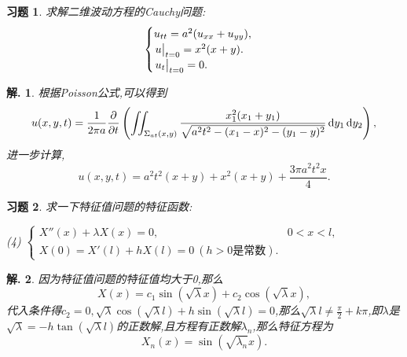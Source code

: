 \documentclass[a4paper,oneside,12pt]{ctexart}
\theoremstyle{plain}
\newtheorem{exercise}{习题}
\theoremstyle{nonumberplain}
\newtheorem{solution}{解.}
\theoremstyle{nonumberplain}
\begin{document}
    \begin{exercise}
        \label{ex:21}
        求解二维波动方程的Cauchy问题:
        \begin{equation*}
            \begin{cases}
                u_{tt}=a^2(u_{xx}+u_{yy}),\\
                \eval{u}_{t=0}=x^2(x+y).\\
                \eval{u_t}_{t=0}=0.
            \end{cases}
        \end{equation*}
    \end{exercise}
    
    \begin{solution}
        根据Poisson公式,可以得到 
        \begin{equation*}
            u(x,y,t)=\frac{1}{2\pi a}\pdv{t}\left(\iint_{\Sigma_{at}(x,y)}\frac{x_1^2(x_1+y_1)}{\sqrt{a^2t^2-(x_1-x)^2-(y_1-y)^2}}\dd{y_1}\dd{y_2}\right),
        \end{equation*}
        进一步计算, 
        \begin{equation*}
            u(x,y,t)=a^2t^2(x+y)+x^2(x+y)+\frac{3\pi a^2t^2x}{4}.
        \end{equation*}
    \end{solution}

    \begin{exercise}
        \label{ex:22.(4)}
        求一下特征值问题的特征函数:

        (4) $\begin{cases}
            X''(x)+\lambda X(x)=0, & 0<x<l,\\
            X(0)=X'(l)+hX(l)=0\ (h>0\text{是常数}).
        \end{cases}$
    \end{exercise}

    \begin{solution}
        因为特征值问题的特征值均大于0,那么 
        \begin{equation*}
            X(x)=c_1\sin(\sqrt{\lambda}x)+c_2\cos(\sqrt{\lambda} x),
        \end{equation*}
        代入条件得$c_2=0,\sqrt{\lambda}\cos(\sqrt{\lambda}l)+h\sin(\sqrt{\lambda}l)=0$,那么$\sqrt{\lambda}l\neq\frac{\pi}{2}+k\pi$,即$\lambda$是
        $\sqrt{\lambda}=-h\tan(\sqrt{\lambda}l)$的正数解,且方程有正数解$\lambda_n$,那么特征方程为 
        \begin{equation*}
            X_n(x)=\sin(\sqrt{\lambda_n}x).
        \end{equation*}
    \end{solution}
\end{document}
